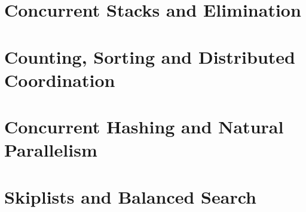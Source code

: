 \documentclass[letter,12pt]{report}
\begin{document}
\chapter{Concurrent Stacks and Elimination}


\chapter{Counting, Sorting and Distributed Coordination}




\chapter{Concurrent Hashing and Natural Parallelism}










\chapter{Skiplists and Balanced Search}









\end{document}
